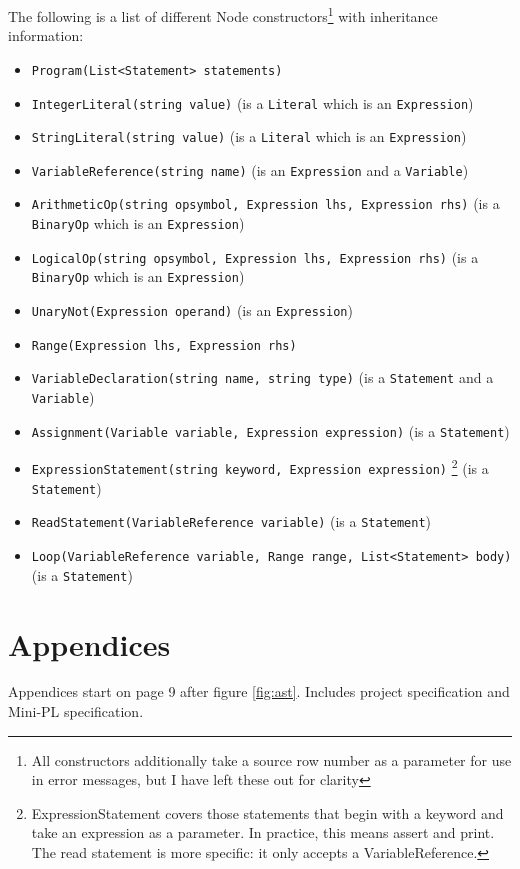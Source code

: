 \documentclass[a4paper,11pt]{article}
\begin{document}
The following is a list of different Node constructors\footnote{All constructors additionally take a source row number as a parameter for use in error messages, but I have left these out for clarity} with inheritance information:
\begin{itemize}
    \item \verb,Program(List<Statement> statements),
    \item \verb,IntegerLiteral(string value), (is a \verb,Literal, which is an \verb,Expression,)
    \item \verb,StringLiteral(string value), (is a \verb,Literal, which is an \verb,Expression,)
    \item \verb,VariableReference(string name), (is an \verb,Expression, and a \verb,Variable,)
    \item \verb/ArithmeticOp(string opsymbol, Expression lhs, Expression rhs)/ (is a \verb,BinaryOp, which is an \verb,Expression,)
    \item \verb/LogicalOp(string opsymbol, Expression lhs, Expression rhs)/ (is a \verb,BinaryOp, which is an \verb,Expression,)
    \item \verb/UnaryNot(Expression operand)/ (is an \verb,Expression,)
    \item \verb/Range(Expression lhs, Expression rhs)/
    \item \verb/VariableDeclaration(string name, string type)/ (is a \verb,Statement, and a \verb,Variable,)
    \item \verb/Assignment(Variable variable, Expression expression)/ (is a \verb,Statement,)
    \item \verb/ExpressionStatement(string keyword, Expression expression)/ \footnote{ExpressionStatement covers those statements that begin with a keyword and take an expression as a parameter. In practice, this means assert and print. The read statement is more specific: it only accepts a VariableReference.} (is a \verb,Statement,)
    \item \verb/ReadStatement(VariableReference variable)/ (is a \verb,Statement,)
    \item \verb/Loop(VariableReference variable, Range range, List<Statement> body)/ (is a \verb,Statement,)
\end{itemize}

\appendix
\section{Appendices}

Appendices start on page 9 after figure \ref{fig:ast}. Includes project specification and Mini-PL specification.




\end{document}
